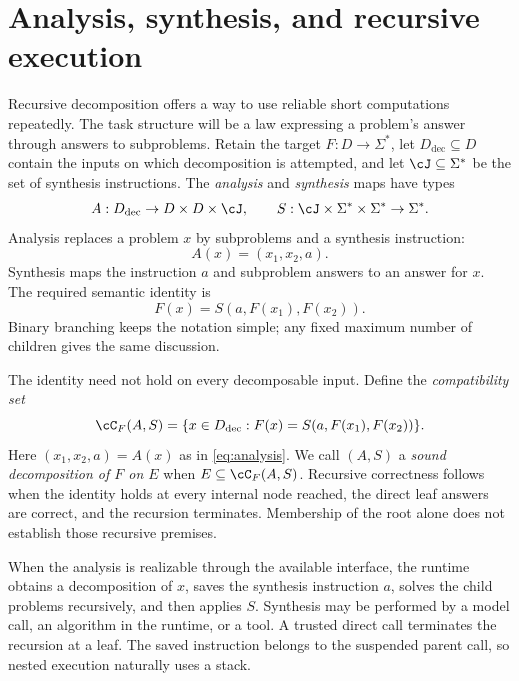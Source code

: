 \documentclass[11pt,twoside]{article}
\theoremstyle{definition}
\theoremstyle{remark}
\begin{document}
\section{Analysis, synthesis, and recursive execution}
\label{sec:recursion}

Recursive decomposition offers a way to use reliable short computations
repeatedly. The task structure will be a law expressing a problem's answer
through answers to subproblems. Retain the target
$F:D\to\Sigma^*$, let $D_{\mathrm{dec}}\subseteq D$ contain the inputs
on which decomposition is attempted, and let $\cJ\subseteq\Sigma^*$ be
the set of synthesis instructions. The \emph{analysis} and
\emph{synthesis} maps have types
\[
 A:D_{\mathrm{dec}}\to D\times D\times\cJ,
 \qquad S:\cJ\times\Sigma^*\times\Sigma^*\to\Sigma^*.
\]
Analysis replaces a problem $x$ by subproblems and a synthesis instruction:
\begin{equation}
 A(x)=(x_1,x_2,a).
 \label{eq:analysis}
\end{equation}
Synthesis maps the instruction $a$ and subproblem answers to an answer
for $x$. The required semantic identity is
\begin{equation}
 F(x)=S(a,F(x_1),F(x_2)).
 \label{eq:synthesis-law}
\end{equation}
Binary branching keeps the notation simple; any fixed maximum number of
children gives the same discussion.

The identity need not hold on every decomposable input. Define the
\emph{compatibility set}
\[
 \cC_F(A,S)=\{x\in D_{\mathrm{dec}}:
       F(x)=S(a,F(x_1),F(x_2))\}.
\]
Here $(x_1,x_2,a)=A(x)$ as in \eqref{eq:analysis}.
We call $(A,S)$ a \emph{sound decomposition of $F$ on $E$} when
$E\subseteq\cC_F(A,S)$. Recursive correctness follows when the identity
holds at every internal node reached, the direct leaf answers are correct,
and the recursion terminates. Membership of the root alone does not
establish those recursive premises.

When the analysis is realizable through the available interface, the
runtime obtains a decomposition of $x$, saves the
synthesis instruction $a$, solves the child problems recursively, and
then applies $S$. Synthesis may be performed by a model call, an algorithm
in the runtime, or a tool. A trusted direct call terminates the recursion
at a leaf. The saved instruction
belongs to the suspended parent call, so nested execution naturally uses
a stack.
\end{document}
